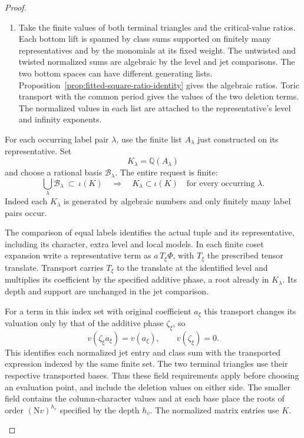 \begin{proof}
\begin{enumerate}
For each occurring definite class and both chains take the
entries of the normalized jet in the coefficient bases. The
entries are algebraic by the CM normalization of the differential
and the jet comparison at the same finite level
(Section~\ref{subsec:selected-kernel-jets}).
\item Take the finite values of both terminal triangles and
the critical-value ratios. Each bottom lift is spanned by class
sums supported on finitely many representatives and by the
monomials at its fixed weight. The untwisted and twisted
normalized sums are algebraic by the level and jet comparisons.
The two bottom spaces can have different generating lists.
Proposition~\ref{prop:fitted-square-ratio-identity} gives the
algebraic ratios. Toric transport with the common period gives
the values of the two deletion terms. The normalized
values in each list are attached to the representative's
level and infinity exponents.
\end{enumerate}


For each occurring label pair \(\lambda\), use the finite
list \(A_\lambda\) just constructed on its representative.
Set 
\[
  K_\lambda=\mathbb Q(A_\lambda)
\]
 and choose a rational
basis \(\mathcal B_\lambda\). The entire request is finite:
\[
 \bigcup_\lambda\mathcal B_\lambda\ \subset\ \iota(K)
       \quad\Longrightarrow\quad
 K_\lambda\subset\iota(K)\quad\text{for every occurring }\lambda .
\]
Indeed each \(K_\lambda\) is generated by algebraic numbers
and only finitely many label pairs occur.

The comparison of equal labels identifies the actual tuple
and its representative, including its character, extra level
and local models. In each finite coset expansion write a
representative term as \(a\,T_\xi \Phi\), with \(T_\xi\)
the prescribed tensor translate. Transport carries \(T_\xi\)
to the translate at the identified level and multiplies its
coefficient by the specified additive phase, a root already
in \(K_\lambda\). Its depth and support are unchanged
in the jet comparison.

For a term in this index set with original coefficient \(a_\xi\) this transport changes its valuation only by that of the additive phase \(\zeta_\xi\), so
\[
  v(\zeta_\xi a_\xi)=v(a_\xi),\qquad v(\zeta_\xi)=0 .
\]
 This identifies each normalized jet
entry and class sum with the transported expression indexed by the same finite set. The two terminal triangles use their
respective transported bases. Thus these field requirements
apply before choosing an evaluation point, and include the
deletion values on either side. The smaller field contains
the column-character values and at each base place the roots
of order \((\mathrm Nv)^{h_v}\) specified by the depth \(h_v\).
The normalized matrix entries use \(K\).

\label{cor:fitted-evaluation-1}

\end{proof}

